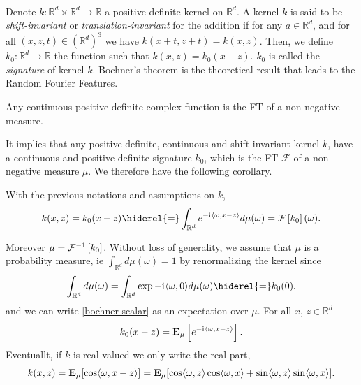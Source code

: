 \paragraph{}
Denote $k: \mathbb{R}^d \times \mathbb{R}^d \to \mathbb{R}$ a positive
definite kernel on $\mathbb{R}^d$. A kernel $k$ is said to be
\emph{shift-invariant} or \emph{translation-invariant} for the addition if for
any $a \in \mathbb{R}^d$, and for all $(x,z,t) \in \left(\mathbb{R}^d\right)^3$
we have $k(x+t,z+t) = k(x,z)$.  Then, we define $k_0: \mathbb{R}^d \to
\mathbb{R}$ the function such that $k(x,z)= k_0(x-z)$. $k_0$ is called the
\emph{signature} of kernel $k$. Bochner's theorem \cite{folland1994course} is
the theoretical result that leads to the Random Fourier Features.
\begin{theorem}\label{th:bochner-scalar}
    Any continuous positive definite complex function is the \acl{FT} of a
    non-negative measure.
\end{theorem}
It implies that any positive definite, continuous and shift-invariant kernel
$k$, have a continuous and positive definite signature $k_0$, which is the
\acl{FT} $\mathcal{F}$ of a non-negative measure $\mu$. We therefore have the
following corollary.
\begin{corollary}\label{c:bochner-app}
    With the previous notations and assumptions on $k$,
    \begin{dmath}\label{bochner-scalar}
        k(x,z)=k_0(x-z) \hiderel{=} \int_{\mathbb{R}^d} e^{-\iu \inner{\omega,x
        - z}} d\mu(\omega)
        =\FT{k_0}(\omega).
    \end{dmath}
\end{corollary}
Moreover $\mu = \mathcal{F}^{-1}\left[k_0\right]$.  Without loss of generality, we assume that $\mu$
is a probability measure, \acs{ie} $\int_{\mathbb{R}^d} d\mu(\omega)=1$ by
renormalizing the kernel since
\begin{dmath*}
    \int_{\mathbb{R}^d}d\mu(\omega)= \int_{\mathbb{R}^d}\exp{-\iu
    \inner{\omega, 0}}d\mu(\omega)\hiderel{=}k_0(0). 
\end{dmath*}
and we can write \cref{bochner-scalar} as an expectation over $\mu$. For all
$x$,
$z\in\mathbb{R}^d$
\begin{dmath*}
    k_0(x-z) = \expectation_{\mu}\left[e^{-\iu \inner{\omega,x - z}}\right].
\end{dmath*}
Eventuallt, if $k$ is real valued we only write the real part, 
\begin{dmath*}
    k(x,z) = \expectation_{\mu}[\cos \inner{\omega,x - z}] =
    \expectation_{\mu}[ \cos \inner{\omega,z} \cos \inner{\omega,x} + \sin
    \inner{\omega,z} \sin \inner{\omega,x}].
\end{dmath*}
